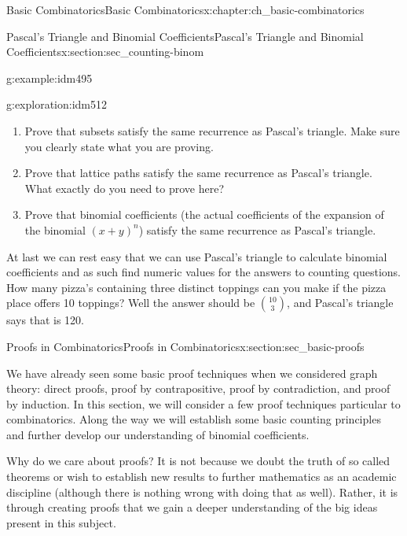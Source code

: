 \documentclass[oneside,10pt,]{book}
\numberwithin{equation}{chapter}
\begin{document}
\begin{chapterptx}{Basic Combinatorics}{}{Basic Combinatorics}{}{}{x:chapter:ch_basic-combinatorics}
\begin{sectionptx}{Pascal's Triangle and Binomial Coefficients}{}{Pascal's Triangle and Binomial Coefficients}{}{}{x:section:sec_counting-binom}
\begin{example}{}{g:example:idm495}
\end{example}
\begin{exploration}{}{g:exploration:idm512}%
\begin{enumerate}[font=\bfseries,label=(\alph*),ref=\alph*]
\item{}Prove that subsets satisfy the same recurrence as Pascal's triangle. Make sure you clearly state what you are proving.%
\item{}Prove that lattice paths satisfy the same recurrence as Pascal's triangle.  What exactly do you need to prove here?%
\item{}Prove that binomial coefficients (the actual coefficients of the expansion of the binomial \((x+y)^n\)) satisfy the same recurrence as Pascal's triangle.%
\end{enumerate}
\end{exploration}
At last we can rest easy that we can use Pascal's triangle to calculate binomial coefficients and as such find numeric values for the answers to counting questions. How many pizza's containing three distinct toppings can you make if the pizza place offers 10 toppings?  Well the answer should be \(\binom{10}{3}\), and Pascal's triangle says that is 120.%
\end{sectionptx}
%
%
\typeout{************************************************}
\typeout{************************************************}
%
\begin{sectionptx}{Proofs in Combinatorics}{}{Proofs in Combinatorics}{}{}{x:section:sec_basic-proofs}
\begin{introduction}{}%
We have already seen some basic proof techniques when we considered graph theory: direct proofs, proof by contrapositive, proof by contradiction, and proof by induction.  In this section, we will consider a few proof techniques particular to combinatorics.  Along the way we will establish some basic counting principles and further develop our understanding of binomial coefficients.%
\par
Why do we care about proofs?  It is not because we doubt the truth of so called theorems or wish to establish new results to further mathematics as an academic discipline (although there is nothing wrong with doing that as well).  Rather, it is through creating proofs that we gain a deeper understanding of the big ideas present in this subject.%
\end{introduction}%
%
%
\typeout{************************************************}

\end{sectionptx}
\end{chapterptx}
\end{document}
